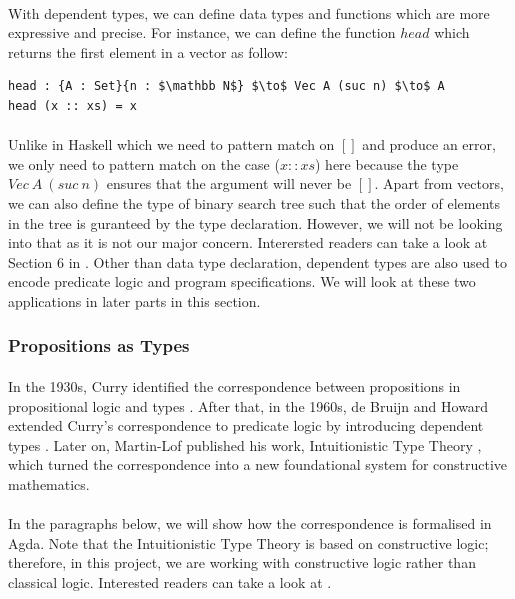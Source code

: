 \documentclass[twoside,openright,final]{bhamthesis}
\begin{document}
\paragraph{} With dependent types, we can define data types and
functions which are more expressive and precise. For instance, we can
define the function \(head\) which returns the first element in a
vector as follow:
\begin{lstlisting}[mathescape=true,xleftmargin=.25\textwidth]
head : {A : Set}{n : $\mathbb N$} $\to$ Vec A (suc n) $\to$ A
head (x :: xs) = x 
\end{lstlisting} 
\paragraph{} Unlike in Haskell which we need to pattern match on \([]\)
and produce an error, we only need to pattern match on the case (\(x :: xs\)) here
because the type \(Vec\ A\ (suc\ n)\) ensures that the argument will never
be \([]\). Apart from vectors, we can also define the type of binary
search tree such that the order of elements in the tree is guranteed by
the type declaration. However, we will not be looking into that as it
is not our major concern. Interersted readers can take a look at
Section 6 in \cite{bove2009}. Other than data type declaration,
dependent types are also used to encode predicate logic and
program specifications. We will look at these two applications in
later parts in this section. 

\subsubsection{Propositions as Types}
\paragraph{} In the 1930s, Curry identified the
correspondence between propositions in propositional logic and types
\cite{curry1934}. After that, in the 1960s, de Bruijn and Howard extended
Curry's correspondence to predicate logic by introducing dependent
types \cite{bruijn1968, howard1969}. Later on, Martin-Lof published
his work, Intuitionistic Type Theory \cite{martin1984}, which turned the correspondence into a new
foundational system for constructive mathematics. 

\paragraph{} In the paragraphs below, we will show how the correspondence is
formalised in Agda. Note that the Intuitionistic Type
Theory is based on constructive logic; therefore, in this project, we
are working with constructive logic rather than classical logic. Interested readers can take a look at
\cite{avigad2000}. 
\end{document}
